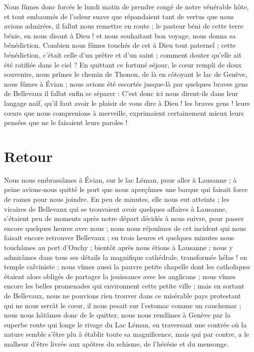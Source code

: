\documentclass[11pt,a4paper]{report}
\begin{document}
Nous fûmes donc forcés le lundi matin de prendre congé de notre vénérable hôte, et tout embaumés de l'odeur suave que répandaient tant de vertus que nous avions admirées, il fallut nous remettre en route ; le pasteur béni de cette terre bénie, en nous disant à Dieu ! et nous souhaitant bon voyage, nous donna sa bénédiction. Combien nous fûmes touchés de cet à Dieu tout paternel ; cette bénédiction, c'était celle d'un prêtre et d'un saint ; comment douter qu'elle ait été ratifiée dans le ciel ? En quittant ce fortuné séjour, le cœur rempli de doux souvenirs, nous prîmes le chemin de Thonon, de là en côtoyant le lac de Genève, nous fûmes à Évian ; nous avions été escortés jusque-là par quelques braves gens de Bellevaux il fallut enfin se séparer : C'est donc ici nous dirent-ils dans leur langage naïf, qu'il faut avoir le plaisir de vous dire à Dieu ! les braves gens ! leurs cœurs que nous comprenions à merveille, exprimaient certainement mieux leurs pensées que ne le faisaient leurs paroles !

\section*{Retour}

Nous nous embrassâmes à Évian, sur le lac Léman, pour aller à Lausanne ; à peine avions-nous quitté le port que nous aperçûmes une barque qui faisait force de rames pour nous joindre. En peu de minutes, elle nous eut atteints ; les vicaires de Bellevaux qui se trouvaient avoir quelques affaires à Lausanne, s'étaient peu de moments après notre départ décidés à nous suivre, pour passer encore quelques heures avec nous ; nous nous réjouîmes de cet incident qui nous faisait encore retrouver Bellevaux ; en trois heures et quelques minutes nous touchâmes au port d'Ouchy ; bientôt après nous étions à Lausanne ; nous y admirâmes dans tous ses détails la magnifique cathédrale, transformée hélas ! en temple calviniste ; nous vîmes aussi la pauvre petite chapelle dont les catholiques étaient alors obligés de partager la jouissance avec les anglicans ; nous vîmes encore les belles promenades qui environnent cette petite ville ; mais en sortant de Bellevaux, nous ne pouvions rien trouver dans ce misérable pays protestant qui ne nous serrât le cœur, il nous pesait sur l'estomac comme un cauchemar ; nous nous hâtâmes donc de le quitter, nous nous rendîmes à Genève par la superbe route qui longe le rivage du Lac Léman, en traversant une contrée où la nature semble s'être plu à établir toute sa magnificence, mais qui par contre, a le malheur d'être livrée aux apôtres du schisme, de l'hérésie et du mensonge.
\end{document}
